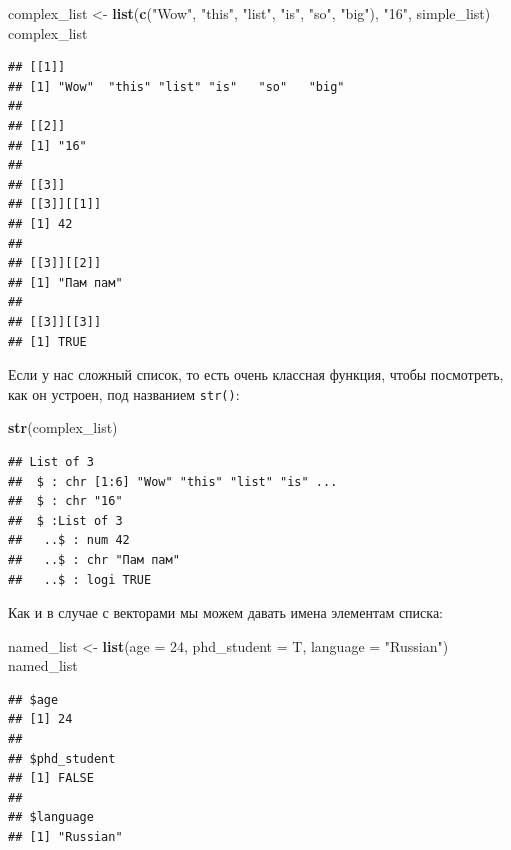 \documentclass[
]{book}
\newenvironment{Shaded}{\begin{snugshade}}{\end{snugshade}}
\newcommand{\DataTypeTok}[1]{\textcolor[rgb]{0.13,0.29,0.53}{#1}}
\newcommand{\DecValTok}[1]{\textcolor[rgb]{0.00,0.00,0.81}{#1}}
\newcommand{\KeywordTok}[1]{\textcolor[rgb]{0.13,0.29,0.53}{\textbf{#1}}}
\newcommand{\NormalTok}[1]{#1}
\newcommand{\StringTok}[1]{\textcolor[rgb]{0.31,0.60,0.02}{#1}}
\begin{document}
\begin{Shaded}
\begin{Highlighting}[]
\NormalTok{complex_list <-}\StringTok{ }\KeywordTok{list}\NormalTok{(}\KeywordTok{c}\NormalTok{(}\StringTok{"Wow"}\NormalTok{, }\StringTok{"this"}\NormalTok{, }\StringTok{"list"}\NormalTok{, }\StringTok{"is"}\NormalTok{, }\StringTok{"so"}\NormalTok{, }\StringTok{"big"}\NormalTok{), }\StringTok{"16"}\NormalTok{, simple_list)}
\NormalTok{complex_list}
\end{Highlighting}
\end{Shaded}

\begin{verbatim}
## [[1]]
## [1] "Wow"  "this" "list" "is"   "so"   "big" 
## 
## [[2]]
## [1] "16"
## 
## [[3]]
## [[3]][[1]]
## [1] 42
## 
## [[3]][[2]]
## [1] "Пам пам"
## 
## [[3]][[3]]
## [1] TRUE
\end{verbatim}

Если у нас сложный список, то есть очень классная функция, чтобы посмотреть, как он устроен, под названием \texttt{str()}:

\begin{Shaded}
\begin{Highlighting}[]
\KeywordTok{str}\NormalTok{(complex_list)}
\end{Highlighting}
\end{Shaded}

\begin{verbatim}
## List of 3
##  $ : chr [1:6] "Wow" "this" "list" "is" ...
##  $ : chr "16"
##  $ :List of 3
##   ..$ : num 42
##   ..$ : chr "Пам пам"
##   ..$ : logi TRUE
\end{verbatim}

Как и в случае с векторами мы можем давать имена элементам списка:

\begin{Shaded}
\begin{Highlighting}[]
\NormalTok{named_list <-}\StringTok{ }\KeywordTok{list}\NormalTok{(}\DataTypeTok{age =} \DecValTok{24}\NormalTok{, }\DataTypeTok{phd_student =}\NormalTok{ T, }\DataTypeTok{language =} \StringTok{"Russian"}\NormalTok{)}
\NormalTok{named_list}
\end{Highlighting}
\end{Shaded}

\begin{verbatim}
## $age
## [1] 24
## 
## $phd_student
## [1] FALSE
## 
## $language
## [1] "Russian"
\end{verbatim}
\end{document}
